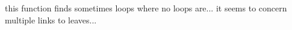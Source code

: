 
\begin{DoxyRefList}
\item[\label{bug__bug000001}%
\hypertarget{bug__bug000001}{}%
Global \hyperlink{globaltools_8py_a388d233340dff99be67f0afc03953992}{rpgtoolbox\+:\+:globaltools.find\+Loops} (struc=\{\}, elem=\textquotesingle{}\textquotesingle{}, way=\mbox{[}\mbox{]}, result=\mbox{[}\mbox{]})]this function finds sometimes loops where no loops are... it seems to concern multiple links to leaves... 
\end{DoxyRefList}